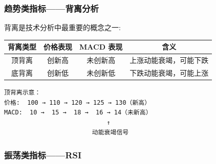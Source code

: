 \begin{frame}[fragile]
    \frametitle{趋势类指标——背离分析}

    \alert{背离}是技术分析中最重要的概念之一: 

    \begin{table}[htbp]
        \centering
        \begin{tabular}{cccc}
            \toprule
            背离类型 & 价格表现 & MACD 表现 & 含义 \\
            \midrule
            顶背离 & 创新高 & 未创新高 & 上涨动能衰竭，可能下跌 \\
            底背离 & 创新低 & 未创新低 & 下跌动能衰竭，可能上涨 \\
            \bottomrule
        \end{tabular}
    \end{table}

    \begin{verbatim}
顶背离示意：
价格:  100 → 110 → 120 → 125 → 130（新高）
MACD:  10 →  15 →  18 →  16 → 14（未新高）
                            ↑
                        动能衰竭信号
    \end{verbatim}
\end{frame}

\begin{frame}
	\frametitle{振荡类指标——RSI}
\end{frame}